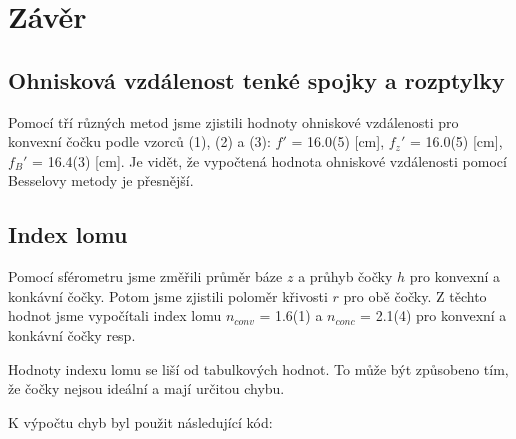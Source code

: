 \documentclass[a4paper,11pt]{article}
\begin{document}
    \hspace{10pt}  
    \begin{minipage}[t]{0.5\textwidth} 
                \section{Závěr}  
                    \subsection{Ohnisková vzdálenost tenké spojky a rozptylky}
                        Pomocí tří různých metod jsme zjistili hodnoty ohniskové vzdálenosti pro konvexní čočku podle vzorců (1), (2) a (3): $f'$ = 16.0(5) [cm], $f_z'$ = 16.0(5) [cm], $f_B'$ = 16.4(3) [cm]. Je vidět, že vypočtená hodnota ohniskové vzdálenosti pomocí Besselovy metody je přesnější.
                    \subsection{Index lomu}
                        Pomocí sférometru jsme změřili průměr báze $z$ a průhyb čočky $h$ pro konvexní a konkávní čočky. Potom jsme zjistili poloměr křivosti $r$ pro obě čočky. Z těchto hodnot jsme vypočítali index lomu $n_{conv}$ = 1.6(1) a $n_{conc}$ = 2.1(4) pro konvexní a konkávní čočky resp. 
                        \par Hodnoty indexu lomu se liší od tabulkových hodnot. To může být způsobeno tím, že čočky nejsou ideální a mají určitou chybu. 
    \end{minipage}
\newpage
    \par K výpočtu chyb byl použit následující kód: 
\end{document}
